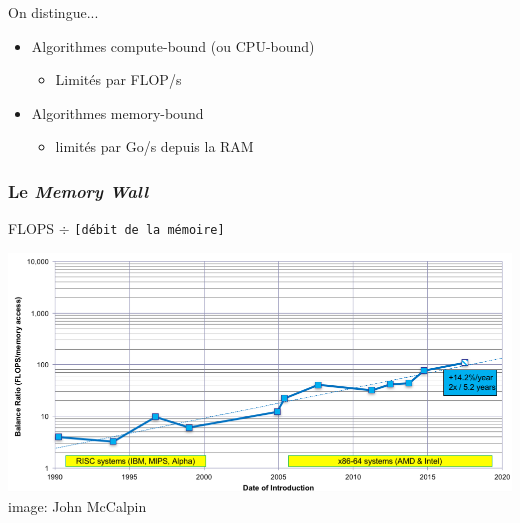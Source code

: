 \documentclass[xcolor={x11names,svgnames}]{beamer}
\begin{document}
\begin{frame}
\bigskip

\begin{block}{On distingue...}
\begin{itemize}
\item Algorithmes \alert{compute-bound} {\small (ou CPU-bound)}
  \begin{itemize}
  \item Limités par FLOP/s
  \end{itemize}
  \medskip
  
\item Algorithmes \alert{memory-bound}
  \begin{itemize}
  \item  limités par Go/s depuis la RAM
  \end{itemize}
\end{itemize}
\end{block}

\end{frame}


\begin{frame}
  \frametitle{Le \og \emph{Memory Wall}\fg{}}

  \begin{center}
    \large FLOPS $\div$ \texttt{[débit de la mémoire]}
  \end{center}

  \bigskip
  
  \includegraphics[width=\textwidth]{calpin_wall_bw.png}
  \flushright image: John McCalpin
\end{frame}

\end{document}
